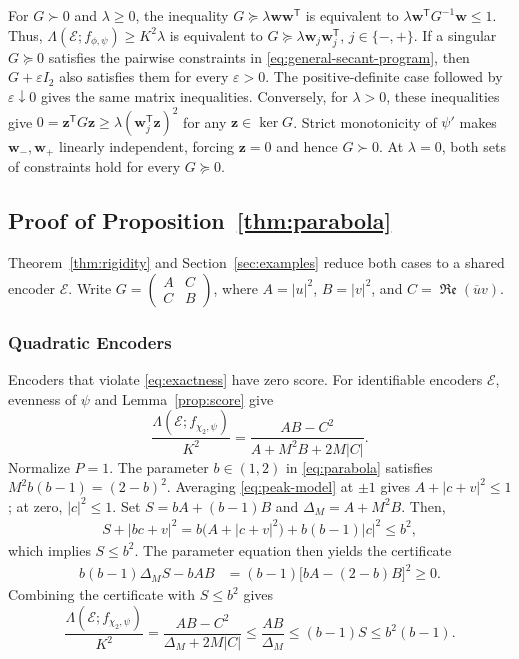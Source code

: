 \documentclass[journal,12pt,onecolumn,draftclsnofoot]{IEEEtran}
\newcommand{\enc}{\mathscr{E}}\newcommand{\dec}{\mathscr{D}}\newcommand{\R}{\mathbb R}\newcommand{\C}{\mathbb C}
\newcommand{\T}{\mathsf T}\newcommand{\suc}{\succeq}
\renewcommand{\Re}{\mathop{\mathfrak{Re}}\nolimits}
\begin{document}
For $G\succ0$ and $\lambda\ge0$, the inequality
$G\succeq\lambda\boldsymbol w\boldsymbol w^\T$
is equivalent to
$\lambda\boldsymbol w^\T G^{-1}\boldsymbol w\le1$.
Thus, $\Lambda(\enc;f_{\phi,\psi})\ge K^2\lambda$ is equivalent to
$G\succeq\lambda\boldsymbol w_j\boldsymbol w_j^\T$, $j\in\{-,+\}$.
If a singular $G\succeq0$ satisfies the pairwise constraints
in \eqref{eq:general-secant-program}, then
$G+\varepsilon I_2$ also satisfies them for every
$\varepsilon>0$.
The positive-definite case followed by $\varepsilon\downarrow0$ gives the same matrix inequalities.
Conversely, for $\lambda>0$, these inequalities give
$0=\boldsymbol z^\T G\boldsymbol z\ge\lambda(\boldsymbol w_j^\T\boldsymbol z)^2$ for any $\boldsymbol z\in\ker G$.
Strict monotonicity of $\psi'$ makes $\boldsymbol w_-,\boldsymbol w_+$ linearly independent, forcing $\boldsymbol z=0$ and hence $G\succ0$.
At $\lambda=0$, both sets of constraints hold for every $G\succeq0$.


\subsection{Proof of Proposition~\ref{thm:parabola}}\label{app:quartic-proof}


Theorem~\ref{thm:rigidity} and Section~\ref{sec:examples} reduce both cases to a shared encoder $\enc$. Write
$G=\left(\begin{smallmatrix}A&C\\C&B\end{smallmatrix}\right)$,
where $A=|u|^2$, $B=|v|^2$, and $C=\Re(\overline u v)$.


\subsubsection{Quadratic Encoders}\label{app:quadratic-proof}


Encoders that violate \eqref{eq:exactness} have zero score. For identifiable encoders $\enc$,
evenness of $\psi$ and Lemma~\ref{prop:score} give
$$
 \frac{{\Lambda(\enc;f_{\chi_2,\psi})}}{K^2}
 =\frac{AB-C^2}{A+M^2B+2M|C|}.
$$
Normalize $P=1$. The parameter $b\in(1,2)$ in \eqref{eq:parabola} satisfies $M^2b(b-1)=(2-b)^2$.
Averaging \eqref{eq:peak-model} at $\pm1$ gives $A+|c+v|^2\le1$; at zero, $|c|^2\le1$.
Set $S=bA+(b-1)B$ and $\Delta_M=A+M^2B$. Then,  
\begin{align*}
 { S}+|bc+v|^2
 =b\bigl(A+|c+v|^2\bigr)+b(b-1)|c|^2\le b^2,
\end{align*}
which implies $S\le b^2$. The parameter equation then yields the certificate
\begin{align*}
 b(b-1)\Delta_M { S}-bAB
 &=(b-1)\bigl[bA-(2-b)B\bigr]^2\ge0.
\end{align*}
Combining the certificate with $S\le b^2$ gives
$$
\frac{\Lambda(\enc;f_{\chi_2,\psi})}{K^2}
=\frac{AB-C^2}{\Delta_M+2M|C|}
\le\frac{AB}{\Delta_M}
\le(b-1)S\le b^2(b-1).
$$
\end{document}
